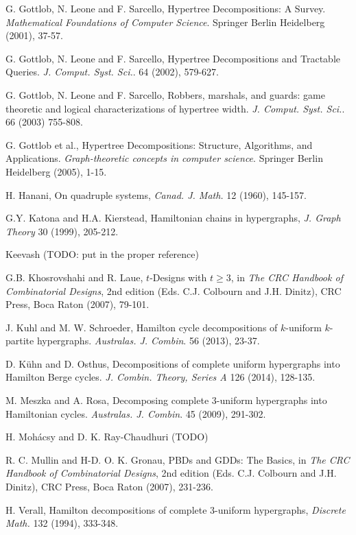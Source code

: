 \begin{thebibliography}{99}
  G. Gottlob, N. Leone and F. Sarcello,
  Hypertree Decompositions: A Survey.
  {\em Mathematical Foundations of Computer Science}.
  Springer Berlin Heidelberg (2001), 37-57.

  G. Gottlob, N. Leone and F. Sarcello,
  Hypertree Decompositions and Tractable Queries.
  {\em J. Comput. Syst. Sci.}. 64 (2002), 579-627.

  G. Gottlob, N. Leone and F. Sarcello,
  Robbers, marshals, and guards: game theoretic and logical characterizations of
  hypertree width.
  {\em J. Comput. Syst. Sci.}. 66 (2003) 755-808.

  G. Gottlob et al.,
  Hypertree Decompositions: Structure, Algorithms, and Applications.
  {\em Graph-theoretic concepts in computer science}.
  Springer Berlin Heidelberg (2005), 1-15.

  H. Hanani,
  On quadruple systems,
  {\em Canad. J. Math.} 12 (1960), 145-157.

  G.Y. Katona and H.A. Kierstead,
  Hamiltonian chains in hypergraphs,
  {\em J. Graph Theory} 30 (1999), 205-212.

  Keevash (TODO: put in the proper reference)

  G.B. Khosrovshahi and R. Laue,
  $t$-Designs with $t \geq 3$,
  in {\em The CRC Handbook of Combinatorial Designs}, 2nd edition
  (Eds. C.J. Colbourn and J.H. Dinitz),
  CRC Press, Boca Raton (2007), 79-101.

  J. Kuhl and M. W. Schroeder,
  Hamilton cycle decompositions of $k$-uniform $k$-partite hypergraphs.
  {\em Australas. J. Combin}. 56 (2013), 23-37.

  D. K\"{u}hn and D. Osthus,
  Decompositions of complete uniform hypergraphs into Hamilton Berge cycles.
  {\em J. Combin. Theory, Series A} 126 (2014), 128-135.

  M. Meszka and A. Rosa,
  Decomposing complete 3-uniform hypergraphs into Hamiltonian cycles.
  {\em Australas. J. Combin}. 45 (2009), 291-302.

  H. Moh\'{a}csy and D. K. Ray-Chaudhuri (TODO)

  R. C. Mullin and H-D. O. K. Gronau,
  PBDs and GDDs: The Basics,
  in {\em The CRC Handbook of Combinatorial Designs}, 2nd edition
  (Eds. C.J. Colbourn and J.H. Dinitz),
  CRC Press, Boca Raton (2007), 231-236.

  H. Verall,
  Hamilton decompositions of complete 3-uniform hypergraphs,
  {\em Discrete Math.} 132 (1994), 333-348.


\end{thebibliography}
